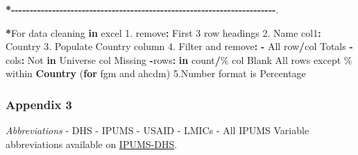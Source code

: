 \documentclass[
]{article}
\newenvironment{Shaded}{\begin{snugshade}}{\end{snugshade}}
\newcommand{\ControlFlowTok}[1]{\textcolor[rgb]{0.13,0.29,0.53}{\textbf{#1}}}
\newcommand{\DecValTok}[1]{\textcolor[rgb]{0.00,0.00,0.81}{#1}}
\newcommand{\FloatTok}[1]{\textcolor[rgb]{0.00,0.00,0.81}{#1}}
\newcommand{\FunctionTok}[1]{\textcolor[rgb]{0.13,0.29,0.53}{\textbf{#1}}}
\newcommand{\NormalTok}[1]{#1}
\newcommand{\SpecialCharTok}[1]{\textcolor[rgb]{0.81,0.36,0.00}{\textbf{#1}}}
\begin{document}
\begin{Shaded}
\begin{Highlighting}[]
\SpecialCharTok{*{-}{-}{-}{-}{-}{-}{-}{-}{-}{-}{-}{-}{-}{-}{-}{-}{-}{-}{-}{-}{-}{-}{-}{-}{-}{-}{-}{-}{-}{-}{-}{-}{-}{-}{-}{-}{-}{-}{-}{-}{-}{-}{-}{-}{-}{-}{-}{-}{-}{-}{-}{-}{-}{-}{-}{-}{-}{-}{-}{-}{-}{-}{-}{-}{-}{-}{-}{-}{-}{-}{-}}\NormalTok{.}


\SpecialCharTok{*}\NormalTok{For data cleaning }\ControlFlowTok{in}\NormalTok{ excel}
 \FloatTok{1.}\NormalTok{ remove}\SpecialCharTok{:}
\NormalTok{     First }\DecValTok{3}\NormalTok{ row headings}
 \FloatTok{2.}\NormalTok{ Name col1}\SpecialCharTok{:}\NormalTok{ Country}
 \FloatTok{3.}\NormalTok{ Populate Country column}
 \FloatTok{4.}\NormalTok{ Filter and remove}\SpecialCharTok{:}
    \SpecialCharTok{{-}}\NormalTok{ All row}\SpecialCharTok{/}\NormalTok{col Totals}
    \SpecialCharTok{{-}}\NormalTok{ cols}\SpecialCharTok{:}
\NormalTok{            Not }\ControlFlowTok{in}\NormalTok{ Universe col}
\NormalTok{            Missing }
    \SpecialCharTok{{-}}\NormalTok{rows}\SpecialCharTok{:} \ControlFlowTok{in}\NormalTok{ count}\SpecialCharTok{/}\NormalTok{\% col}
\NormalTok{             Blank}
\NormalTok{             All rows except \% within }\FunctionTok{Country}\NormalTok{ (}\ControlFlowTok{for}\NormalTok{ fgm and ahcdm)}
 \FloatTok{5.}\NormalTok{Number format is Percentage}
\end{Highlighting}
\end{Shaded}

\subsubsection{Appendix 3}\label{appendix-3}

\emph{Abbreviations} - DHS - IPUMS - USAID - LMICs - All IPUMS Variable
abbreviations available on
\href{https://www.idhsdata.org/idhs-action/variables/group}{IPUMS-DHS}.
\end{document}
